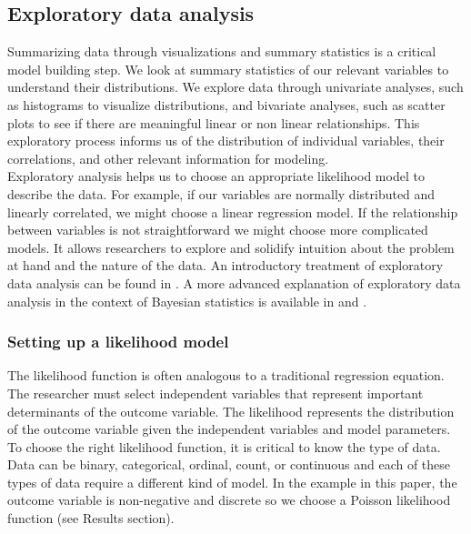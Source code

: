 \documentclass{article}
\begin{document}
\subsection*{Exploratory data analysis}
Summarizing data through visualizations and summary statistics is a critical model building step. We look at summary statistics of our relevant variables to understand their distributions. We explore data through univariate analyses, such as histograms to visualize distributions, and bivariate analyses, such as scatter plots to see if there are meaningful linear or non linear relationships. This exploratory process informs us of the distribution of individual variables, their correlations, and other relevant information for modeling. \\
Exploratory analysis helps us to choose an appropriate likelihood model to describe the data. For example, if our variables are normally distributed and linearly correlated, we might choose a linear regression model. If the relationship between variables is not straightforward we might choose more complicated models.  It allows researchers to explore and solidify intuition about the problem at hand and the nature of the data. An introductory treatment of exploratory data analysis can be found in . A more advanced explanation of exploratory data analysis in the context of Bayesian statistics is available in  and .

\subsubsection{Setting up a likelihood model}
The likelihood function is often analogous to a traditional regression equation. The researcher must select independent variables that represent important determinants of the outcome variable. The likelihood represents the distribution of the outcome variable given the independent variables and model parameters. To choose the right likelihood function, it is critical to know the type of data. Data can be binary, categorical, ordinal, count, or continuous and each of these types of data require a different kind of model. In the example in this paper, the outcome variable is non-negative and discrete so we choose a Poisson likelihood function (see Results section). 
 
\end{document}
